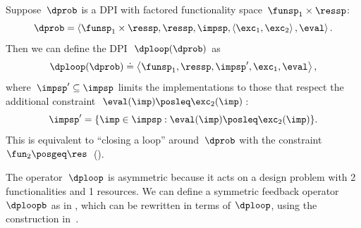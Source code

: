 \begin{defn}[$\dploop$]
\label{def:dp_loop}Suppose~$\dprob$ is a DPI with factored functionality
space~$\funsp_{1}\times\ressp$: 
\[
\dprob=\left\langle \funsp_{1}\times\ressp,\ressp,\impsp,\left\langle \exc_{1},\exc_{2}\right\rangle ,\eval\right\rangle .
\]
Then we can define the DPI~$\dploop(\dprob)$ as 
\[
\dploop(\dprob)\doteq\left\langle \funsp_{1},\ressp,\impsp',\exc_{1},\eval\right\rangle ,
\]
where~$\impsp'\subseteq\impsp$ limits the implementations to those
that respect the additional constraint~$\eval(\imp)\posleq\exc_{2}(\imp)$:
\[
\impsp'=\{\imp\in\impsp:\eval(\imp)\posleq\exc_{2}(\imp)\}.
\]
This is equivalent to ``closing a loop'' around~$\dprob$ with
the constraint~$\fun_{2}\posgeq\res$~().
\end{defn}

The operator~$\dploop$ is asymmetric because it acts on a design
problem with 2 functionalities and 1 resources. We can define a symmetric
feedback operator $\dploopb$ as in , which
can be rewritten in terms of $\dploop$, using the construction in~\emph{.}

